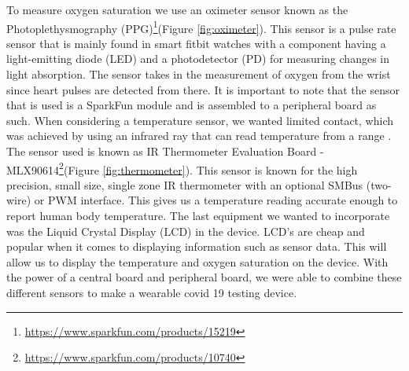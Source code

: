\documentclass[10pt, conference]{IEEEtran}
\begin{document}
To measure oxygen saturation we use an oximeter sensor known as the Photoplethysmography (PPG)\footnote{\href{https://www.sparkfun.com/products/15219}{https://www.sparkfun.com/products/15219}}(Figure \ref{fig:oximeter}). This sensor is a pulse rate sensor that is mainly found in smart fitbit watches with a component having a light-emitting diode (LED) and a photodetector (PD) for measuring changes in light absorption. The sensor takes in the measurement of oxygen from the wrist since heart pulses are detected from there. It is important to note that the sensor that is used is a SparkFun module and is assembled to a peripheral board as such. When considering a temperature sensor, we wanted limited contact, which was achieved by using an infrared ray that can read temperature from a range . The sensor used is known as IR Thermometer Evaluation Board - MLX90614\footnote{\href{https://www.sparkfun.com/products/10740}{https://www.sparkfun.com/products/10740}}(Figure \ref{fig:thermometer}). This sensor is known for the high precision, small size, single zone IR thermometer with an optional SMBus (two-wire) or PWM interface. This gives us a temperature reading accurate enough to report human body temperature. The last equipment we wanted to incorporate was the Liquid Crystal Display (LCD) in the device. LCD’s are cheap and popular when it comes to displaying information such as sensor data. This will allow us to display the temperature and oxygen saturation on the device. With the power of a central board and peripheral board, we were able to combine these different sensors to make a wearable covid 19 testing device.
\end{document}
